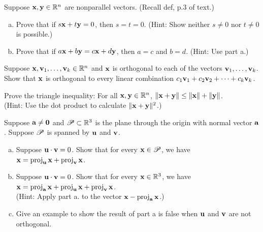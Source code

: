 \begin{problem}[SA 1.1.25]
Suppose $\mathbf{x}, \mathbf{y} \in \mathbb{R}^n$ are nonparallel vectors. (Recall def, p.3 of text.)
\begin{enumerate}[a.]
\item 
Prove that if $s\mathbf{x} + t\mathbf{y} = 0$, then $s = t = 0$. 
(Hint: Show neither $s \neq 0$ nor $t \neq0$ is possible.)
\item Prove that if $a\mathbf{x} + b\mathbf{y} = c\mathbf{x} + d\mathbf{y}$, then $a = c$ and $b = d$.
(Hint: Use part a.)
\end{enumerate}
\end{problem}


\newpage

\begin{problem}[SA 1.2.11]
Suppose $\mathbf{x}, \mathbf{v}_1, \dots, \mathbf{v}_k \in \mathbb{R}^n$ and $\mathbf{x}$ is orthogonal to each of
the vectors $\mathbf{v}_1,\dots, \mathbf{v}_k$. Show that $\mathbf{x}$ is orthogonal to every linear
combination $c_1 \mathbf{v}_1 + c_2 \mathbf{v}_2 + \cdots + c_k \mathbf{v}_k$.
\end{problem}

\newpage

\begin{problem}[SA 1.2.18]
Prove the triangle inequality: For all 
$\mathbf{x}, \mathbf{y} \in \mathbb{R}^n$, $\|\mathbf{x} + \mathbf{y}\| \leq \|\mathbf{x}\| + \|\mathbf{y}\|$. \\
(Hint: Use the dot product to calculate $\|\mathbf{x} + \mathbf{y}\|^2$.)
\end{problem}

\newpage

\begin{problem}[SA 1.3.12]
Suppose $\mathbf{a} \neq \mathbf{0}$ and $\mathscr P \subset \mathbb{R}^3$ is the plane through the origin
with normal vector $\mathbf{a}$. 
Suppose $\mathscr P$ is spanned by $\mathbf{u}$ and $\mathbf{v}$.
\begin{enumerate}[a.]
\item 
Suppose $\mathbf{u} \cdot \mathbf{v} = 0$. Show that for every $\mathbf{x} \in \mathscr P$, we have
$\mathbf{x} = \operatorname{proj}_{\mathbf{u}} \mathbf{x} + \operatorname{proj}_{\mathbf{v}} \mathbf{x}$.
\item
Suppose $\mathbf{u} \cdot \mathbf{v} = 0$. Show that for every $\mathbf{x} \in \mathbb{R}^3$, we have
$\mathbf{x} = \operatorname{proj}_{\mathbf{a}} \mathbf{x} + \operatorname{proj}_{\mathbf{u}} \mathbf{x} + \operatorname{proj}_{\mathbf{v}} \mathbf{x}$.\\
(Hint: Apply part a. to the vector $\mathbf{x} - \operatorname{proj}_{\mathbf{a}} \mathbf{x}$.)
\item
Give an example to show the result of part a is false when $\mathbf{u}$ and $\mathbf{v}$ are
not orthogonal. 
\end{enumerate}
\end{problem}



